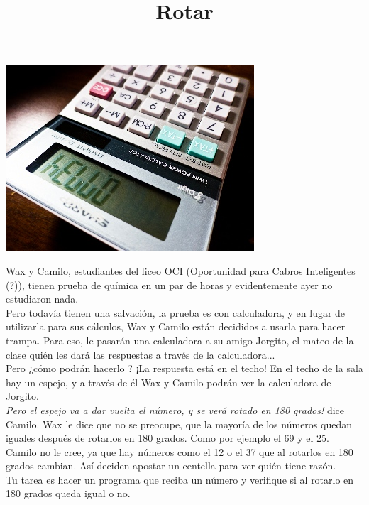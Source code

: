 \documentclass{oci}
\title{Rotar}
\begin{document}
\begin{problemDescription}

  \centerline{\includegraphics[scale=0.5]{upside-down.jpg}}

  Wax y Camilo, estudiantes del liceo OCI (Oportunidad para Cabros Inteligentes (?)), tienen prueba de química en un par de horas
  y evidentemente ayer no estudiaron nada.\\

  Pero todavía tienen una salvación, la prueba es con calculadora, y en lugar de utilizarla para sus cálculos,
  Wax y Camilo están decididos a usarla para hacer trampa. Para eso, le pasarán una calculadora a su amigo Jorgito, el mateo de la clase quién les dará las respuestas a través de la calculadora...\\

  Pero ¿cómo podrán hacerlo ? ¡La respuesta está en el techo! En el techo de la sala hay un espejo, y a través de él Wax y Camilo podrán ver la calculadora de Jorgito. \\

  \textit{Pero el espejo va a dar vuelta el número, y se verá rotado en 180 grados!} dice Camilo. Wax le dice que no se preocupe, que la mayoría de los números quedan iguales después de rotarlos en 180 grados. Como por ejemplo el 69 y el 25.\\

  Camilo no le cree, ya que hay números como el 12 o el 37 que al rotarlos en 180 grados cambian. Así deciden apostar un centella para ver quién tiene razón.\\

  Tu tarea es hacer un programa que reciba un número y verifique si al rotarlo en 180 grados queda igual o no.

\end{problemDescription}
\end{document}
